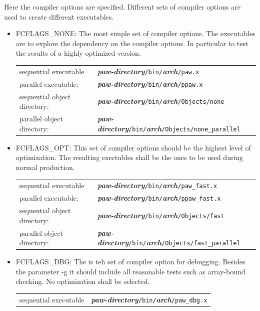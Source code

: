 \documentclass[a4paper,10pt]{report}
\newcommand{\myspec}[1]{\textbf{\textit{#1}}}
\newcommand{\mytt}[1]{{\tt #1}}
\begin{document}
Here the compiler options are specified. Different sets of compiler
options are used to create different executables.
\begin{itemize}
\item FCFLAGS\_NONE: The most simple set of compiler options. The
executables are to explore the dependency on the compiler options. In
particular to test the results of a highly optimized version.  
\begin{center}
\begin{tabular}{|l|l|}
\hline
sequential executable &
\myspec{paw-directory}\mytt{/bin/}\myspec{arch}\mytt{/paw.x}\\
 parallel executable: &
\myspec{paw-directory}\mytt{/bin/}\myspec{arch}\mytt{/ppaw.x}\\
sequential object directory: &
\myspec{paw-directory}\mytt{/bin/}\myspec{arch}\mytt{/Objects/none}\\
parallel object directory: &
\myspec{paw-directory}\mytt{/bin/}\myspec{arch}\mytt{/Objects/none\_parallel}\\
\hline
\end{tabular}
\end{center}
\item FCFLAGS\_OPT: This set of compiler options should be the highest
level of optimization.  The resulting exectubles shall be the ones to
be used during normal production.  
\begin{center}
\begin{tabular}{|l|l|}
\hline
sequential executable &
\myspec{paw-directory}\mytt{/bin/}\myspec{arch}\mytt{/paw\_fast.x}\\
 parallel executable: &
\myspec{paw-directory}\mytt{/bin/}\myspec{arch}\mytt{/ppaw\_fast.x}\\
sequential object directory: &
\myspec{paw-directory}\mytt{/bin/}\myspec{arch}\mytt{/Objects/fast}\\
parallel object directory: &
\myspec{paw-directory}\mytt{/bin/}\myspec{arch}\mytt{/Objects/fast\_parallel}\\
\hline
\end{tabular}
\end{center}
\item FCFLAGS\_DBG: The is teh set of compiler option for
debugging. Besides the parameter -g it should include all reasonable tests
such as array-bound checking. No optimization shall be selected.
\begin{center}
\begin{tabular}{|l|l|}
\hline
sequential executable &
\myspec{paw-directory}\mytt{/bin/}\myspec{arch}\mytt{/paw\_dbg.x}\\

\end{tabular}
\end{center}
\end{itemize}
\end{document}
